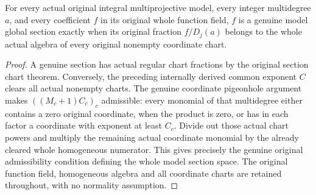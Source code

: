 \begin{theorem}
\label{thm:model-sections-iff-chart-fractions}
\leanok
{}
For every actual original integral multiprojective model, every integer
multidegree $a$, and every coefficient $f$ in its original whole function field,
$f$ is a genuine model global section exactly when its original fraction
$f/D_j(a)$ belongs to the whole actual algebra of every original nonempty
coordinate chart.
\end{theorem}
\begin{proof}
A genuine section has actual regular chart fractions by the original section
chart theorem. Conversely, the preceding internally derived common exponent
$C$ clears all actual nonempty charts. The genuine coordinate pigeonhole
argument makes $((M_c+1)C_c)_c$ admissible: every monomial of that multidegree
either contains a zero original coordinate, when the product is zero, or
has in each factor a coordinate with exponent at least $C_c$. Divide out those
actual chart powers and multiply the remaining actual coordinate monomial
by the already cleared whole homogeneous numerator. This gives precisely
the genuine original admissibility condition defining the whole model
section space. The original function field, homogeneous algebra and all
coordinate charts are retained throughout, with no normality assumption.
\end{proof}
